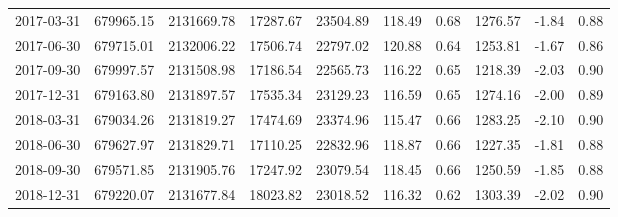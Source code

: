 \begin{landscape}
\begin{longtable}{llllllllll}
2017-03-31 & 679965.15 & 2131669.78 & 17287.67 & 23504.89 & 118.49 & 0.68 & 1276.57 & -1.84  & 0.88 \\
2017-06-30 & 679715.01 & 2132006.22 & 17506.74 & 22797.02 & 120.88 & 0.64 & 1253.81 & -1.67  & 0.86 \\
2017-09-30 & 679997.57 & 2131508.98 & 17186.54 & 22565.73 & 116.22 & 0.65 & 1218.39 & -2.03  & 0.90 \\
2017-12-31 & 679163.80 & 2131897.57 & 17535.34 & 23129.23 & 116.59 & 0.65 & 1274.16 & -2.00  & 0.89 \\
2018-03-31 & 679034.26 & 2131819.27 & 17474.69 & 23374.96 & 115.47 & 0.66 & 1283.25 & -2.10  & 0.90 \\
2018-06-30 & 679627.97 & 2131829.71 & 17110.25 & 22832.96 & 118.87 & 0.66 & 1227.35 & -1.81  & 0.88 \\
2018-09-30 & 679571.85 & 2131905.76 & 17247.92 & 23079.54 & 118.45 & 0.66 & 1250.59 & -1.85  & 0.88 \\
2018-12-31 & 679220.07 & 2131677.84 & 18023.82 & 23018.52 & 116.32 & 0.62 & 1303.39 & -2.02  & 0.90

\end{longtable}
\end{landscape}

